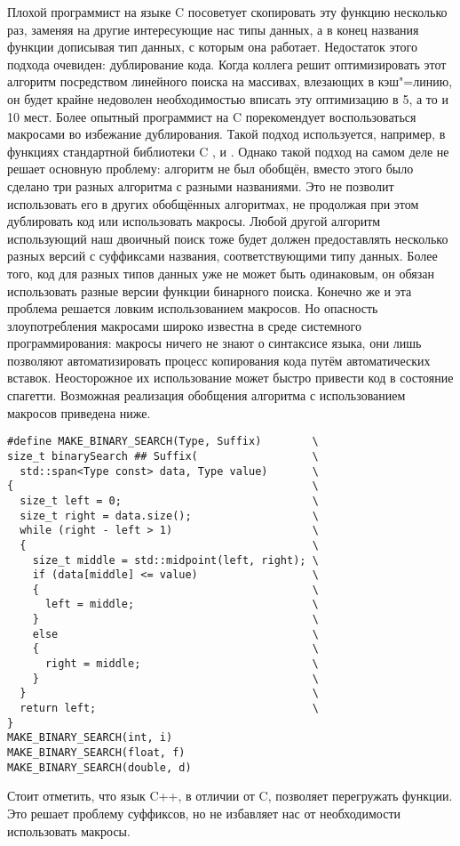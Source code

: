 Плохой программист на языке C посоветует скопировать эту функцию несколько раз, заменяя  на другие интересующие нас типы данных, а в конец названия функции дописывая тип данных, с которым она работает.
Недостаток этого подхода очевиден: дублирование кода.
Когда коллега решит оптимизировать этот алгоритм посредством линейного поиска на массивах, влезающих в кэш"=линию, он будет крайне недоволен необходимостью вписать эту оптимизацию в 5, а то и 10 мест.
Более опытный программист на C порекомендует воспользоваться макросами во избежание дублирования.
Такой подход используется, например, в функциях стандартной библиотеки C ,  и .
Однако такой подход на самом деле не решает основную проблему: алгоритм не был обобщён, вместо этого было сделано три разных алгоритма с разными названиями.
Это не позволит использовать его в других обобщённых алгоритмах, не продолжая при этом дублировать код или использовать макросы.
Любой другой алгоритм использующий наш двоичный поиск тоже будет должен предоставлять несколько разных версий с суффиксами названия, соответствующими типу данных.
Более того, код для разных типов данных уже не может быть одинаковым, он обязан использовать разные версии функции бинарного поиска.
Конечно же и эта проблема решается ловким использованием макросов.
Но опасность злоупотребления макросами широко известна в среде системного программирования: макросы ничего не знают о синтаксисе языка, они лишь позволяют автоматизировать процесс копирования кода путём автоматических вставок.
Неосторожное их использование может быстро привести код в состояние спагетти.
Возможная реализация обобщения алгоритма  с использованием макросов приведена ниже.
\begin{verbatim}
#define MAKE_BINARY_SEARCH(Type, Suffix)        \
size_t binarySearch ## Suffix(                  \
  std::span<Type const> data, Type value)       \
{                                               \
  size_t left = 0;                              \
  size_t right = data.size();                   \
  while (right - left > 1)                      \
  {                                             \
    size_t middle = std::midpoint(left, right); \
    if (data[middle] <= value)                  \
    {                                           \
      left = middle;                            \
    }                                           \
    else                                        \
    {                                           \
      right = middle;                           \
    }                                           \
  }                                             \
  return left;                                  \
}
MAKE_BINARY_SEARCH(int, i)
MAKE_BINARY_SEARCH(float, f)
MAKE_BINARY_SEARCH(double, d)
\end{verbatim}
Стоит отметить, что язык C++, в отличии от C, позволяет перегружать функции.
Это решает проблему суффиксов, но не избавляет нас от необходимости использовать макросы.

